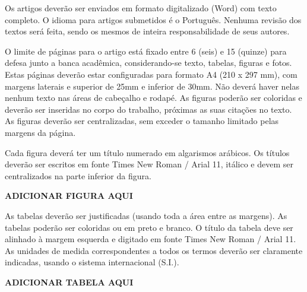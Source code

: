 \documentclass[../main.tex]{subfiles}
\begin{document}
  Os artigos deverão ser enviados em formato digitalizado (Word) com texto  completo.  O  idioma  para  artigos  submetidos  é  o  Português.  Nenhuma  revisão  dos  textos  será  feita,  sendo  os  mesmos  de  inteira  responsabilidade  de  seus  autores.
      
  O limite de páginas para o artigo está fixado entre 6 (seis) e 15 (quinze)  para defesa junto a banca acadêmica, considerando-se texto, tabelas, figuras e  fotos.  Estas  páginas  deverão  estar  configuradas  para  formato  A4  (210  x  297  mm), com margens laterais e superior de 25mm e inferior de 30mm. Não deverá  haver nelas nenhum texto nas áreas de cabeçalho e rodapé. As figuras poderão  ser  coloridas  e  deverão  ser  inseridas  no  corpo  do  trabalho,  próximas  as  suas  citações no texto. As figuras deverão ser centralizadas, sem exceder o tamanho  limitado pelas margens da página.

  Cada  figura  deverá  ter  um  título  numerado  em  algarismos  arábicos.  Os  títulos deverão ser escritos em fonte Times New Roman / Arial 11, itálico e devem  ser centralizados na parte inferior da figura. 

  \textbf{ADICIONAR FIGURA AQUI}

  As tabelas deverão ser justificadas (usando toda a área entre as  margens).  As  tabelas  poderão  ser  coloridas  ou  em  preto  e  branco.  O  título  da  tabela  deve  ser  alinhado  à  margem  esquerda  e  digitado  em  fonte  Times  New  Roman  /  Arial  11.  As  unidades  de  medida  correspondentes  a  todos  os  termos  deverão ser claramente indicadas, usando o sistema internacional (S.I.). 

  \textbf{ADICIONAR TABELA AQUI}
\end{document}
